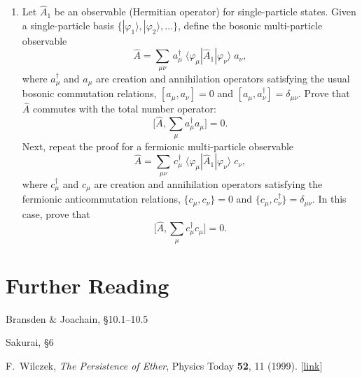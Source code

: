 \documentclass[pra,12pt]{revtex4}
\begin{document}
\begin{enumerate}
\item
  Let $\hat{A}_1$ be an observable (Hermitian operator) for
  single-particle states.  Given a single-particle basis
  $\{|\varphi_1\rangle,|\varphi_2\rangle,\dots\}$, define the
  bosonic multi-particle observable
  \begin{equation}
    \hat{A} = \sum_{\mu\nu} \,a^\dagger_\mu \; \langle\varphi_\mu|\hat{A}_1|\varphi_\nu\rangle \; a_\nu,
  \end{equation}
  where $a_\mu^\dagger$ and $a_\mu$ are creation and annihilation
  operators satisfying the usual bosonic commutation relations,
  $[a_\mu,a_\nu] = 0$ and $[a_\mu,a_\nu^\dagger] = \delta_{\mu\nu}$.
  Prove that $\hat{A}$ commutes with the total number operator:
  \begin{equation}
    \Big[\hat{A}, \sum_\mu a^\dagger_\mu a_\mu \Big] = 0.
  \end{equation}
  Next, repeat the proof for a fermionic multi-particle observable
  \begin{equation}
    \hat{A} = \sum_{\mu\nu} \,c^\dagger_\mu \; \langle\varphi_\mu|\hat{A}_1|\varphi_\nu\rangle \; c_\nu,
  \end{equation}
  where $c_\mu^\dagger$ and $c_\mu$ are creation and annihilation
  operators satisfying the fermionic anticommutation relations,
  $\{c_\mu,c_\nu\} = 0$ and $\{c_\mu,c_\nu^\dagger\} = \delta_{\mu\nu}$.
  In this case, prove that
  \begin{equation}
    \Big[\hat{A}, \sum_\mu c^\dagger_\mu c_\mu \Big] = 0.
  \end{equation}
  \label{ex:n_conserved}

\end{enumerate}

\section*{Further Reading}

\begin{enumerate}[[1{]}]
\item Bransden \& Joachain, \S10.1--10.5

\item Sakurai, \S6

\item F.~Wilczek, \textit{The Persistence of Ether}, Physics Today
  \textbf{52}, 11 (1999). [\href{http://physicstoday.scitation.org/doi/10.1063/1.882562}{link}]
\label{cite:wilczek}
\end{enumerate}
\end{document}
